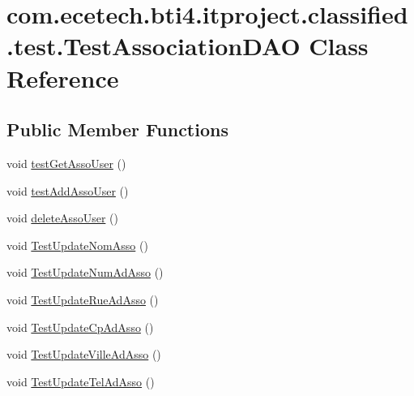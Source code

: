 \hypertarget{classcom_1_1ecetech_1_1bti4_1_1itproject_1_1classified_1_1test_1_1_test_association_d_a_o}{}\section{com.\+ecetech.\+bti4.\+itproject.\+classified.\+test.\+Test\+Association\+D\+AO Class Reference}
\label{classcom_1_1ecetech_1_1bti4_1_1itproject_1_1classified_1_1test_1_1_test_association_d_a_o}
\subsection*{Public Member Functions}
\begin{DoxyCompactItemize}
\item 
void \hyperlink{classcom_1_1ecetech_1_1bti4_1_1itproject_1_1classified_1_1test_1_1_test_association_d_a_o_ab403974b8c441a5af36d4bba8084dcb1}{test\+Get\+Asso\+User} ()
\item 
void \hyperlink{classcom_1_1ecetech_1_1bti4_1_1itproject_1_1classified_1_1test_1_1_test_association_d_a_o_aa273362eba9ca3e2a3f59e91df5f9706}{test\+Add\+Asso\+User} ()
\item 
void \hyperlink{classcom_1_1ecetech_1_1bti4_1_1itproject_1_1classified_1_1test_1_1_test_association_d_a_o_a9f819804a2765fd97cdc2023ff731783}{delete\+Asso\+User} ()
\item 
void \hyperlink{classcom_1_1ecetech_1_1bti4_1_1itproject_1_1classified_1_1test_1_1_test_association_d_a_o_a29e6a529d4987b154cfd8ae54b150c32}{Test\+Update\+Nom\+Asso} ()
\item 
void \hyperlink{classcom_1_1ecetech_1_1bti4_1_1itproject_1_1classified_1_1test_1_1_test_association_d_a_o_ae8bf78de9657e5f642b50d6ce8c4b393}{Test\+Update\+Num\+Ad\+Asso} ()
\item 
void \hyperlink{classcom_1_1ecetech_1_1bti4_1_1itproject_1_1classified_1_1test_1_1_test_association_d_a_o_a52ad273a65bb24f5905165dbd74028e7}{Test\+Update\+Rue\+Ad\+Asso} ()
\item 
void \hyperlink{classcom_1_1ecetech_1_1bti4_1_1itproject_1_1classified_1_1test_1_1_test_association_d_a_o_a4b674d98a860f5e9b413d4cb19a89b47}{Test\+Update\+Cp\+Ad\+Asso} ()
\item 
void \hyperlink{classcom_1_1ecetech_1_1bti4_1_1itproject_1_1classified_1_1test_1_1_test_association_d_a_o_a0df7864f5a02817b61e7ad219a69bf7b}{Test\+Update\+Ville\+Ad\+Asso} ()
\item 
void \hyperlink{classcom_1_1ecetech_1_1bti4_1_1itproject_1_1classified_1_1test_1_1_test_association_d_a_o_a38ea9bd868add0368afd12860f7df8fe}{Test\+Update\+Tel\+Ad\+Asso} ()
\end{DoxyCompactItemize}



